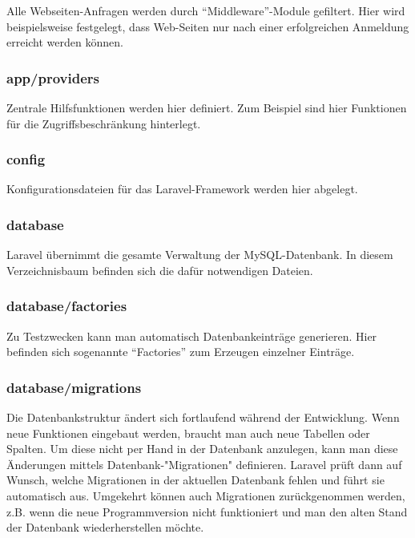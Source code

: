 Alle Webseiten-Anfragen werden durch "`Middleware"'-Module gefiltert. Hier wird beispielsweise festgelegt, dass Web-Seiten nur nach einer erfolgreichen Anmeldung erreicht werden können.

\subsubsection{app/providers}

Zentrale Hilfsfunktionen werden hier definiert. Zum Beispiel sind hier Funktionen für die Zugriffsbeschränkung hinterlegt.

\subsubsection{config}

Konfigurationsdateien für das Laravel-Framework werden hier abgelegt.

\subsubsection{database}

Laravel übernimmt die gesamte Verwaltung der MySQL-Datenbank. In diesem Verzeichnisbaum befinden sich die dafür notwendigen Dateien.

\subsubsection{database/factories}

Zu Testzwecken kann man automatisch Datenbankeinträge generieren. Hier befinden sich sogenannte "`Factories"' zum Erzeugen einzelner Einträge.

\subsubsection{database/migrations}

Die Datenbankstruktur ändert sich fortlaufend während der Entwicklung. Wenn neue Funktionen eingebaut werden, braucht man auch neue Tabellen oder Spalten. Um diese nicht per Hand in der Datenbank anzulegen, kann man diese Änderungen mittels Datenbank-"Migrationen" definieren. Laravel prüft dann auf Wunsch, welche Migrationen in der aktuellen Datenbank fehlen und führt sie automatisch aus. Umgekehrt können auch Migrationen zurückgenommen werden, z.B. wenn die neue Programmversion nicht funktioniert und man den alten Stand der Datenbank wiederherstellen möchte.

